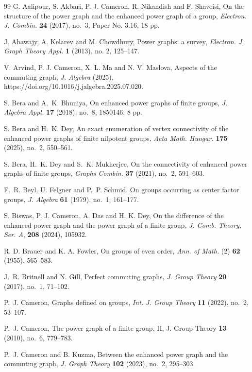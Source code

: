\documentclass[12pt,a4paper]{article}
\begin{document}

\begin{thebibliography}{99}
G. Aalipour, S. Akbari, P. J. Cameron, R. Nikandish and F. Shaveisi, On the structure of the power graph and the enhanced power graph of a group, {\it Electron. J. Combin.} {\bf 24} (2017), no.~3, Paper No. 3.16, 18 pp.

J. Abawajy, A. Kelarev and M. Chowdhury, Power graphs: a survey, {\it Electron. J. Graph Theory Appl.} {\bf 1} (2013), no. 2, 125--147.

V. Arvind, P. J. Cameron, X. L. Ma and N. V. Maslova, Aspects of the commuting graph, {\it J. Algebra} (2025), https://doi.org/10.1016/j.jalgebra.2025.07.020.

S. Bera and A.~K. Bhuniya, On enhanced power graphs of finite groups, {\it J. Algebra Appl.} {\bf 17} (2018), no.~8, 1850146, 8 pp.

S. Bera and H.~K. Dey, An exact enumeration of vertex connectivity of the enhanced power graphs of finite nilpotent groups, {\it Acta Math. Hungar.} {\bf 175} (2025), no.~2, 550--561.

S. Bera, H.~K. Dey and S.~K. Mukherjee, On the connectivity of enhanced power graphs of finite groups, {\it Graphs Combin.} {\bf 37} (2021), no.~2, 591--603. 

F.~R. Beyl, U. Felgner and P.~P. Schmid, On groups occurring as center factor groups, {\it J. Algebra} {\bf 61} (1979), no.~1, 161--177.

S. Biswas, P. J. Cameron, A. Das and H. K. Dey, On the difference of the enhanced power graph and the power graph of a finite group, {\it J. Comb. Theory, Ser. A}, {\bf 208} (2024), 105932.

R. D. Brauer and K. A. Fowler, On groups of even order, {\it Ann. of Math.} (2) {\bf 62} (1955), 565--583.

J.~R. Britnell and N. Gill, Perfect commuting graphs, {\it J. Group Theory} {\bf 20} (2017), no.~1, 71--102.

P.~J. Cameron, Graphs defined on groups, {\it Int. J. Group Theory} {\bf 11} (2022), no.~2, 53--107.

P.~J. Cameron, The power graph of a finite group, II, J. Group Theory {\bf 13} (2010), no.~6, 779--783.

P.~J. Cameron and B. Kuzma, Between the enhanced power graph and the commuting graph, {\it J. Graph Theory} {\bf 102} (2023), no.~2, 295--303.


\end{thebibliography}
\end{document}
